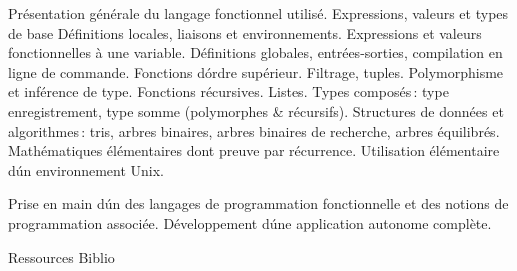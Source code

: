{
Présentation générale du langage fonctionnel utilisé. Expressions, valeurs et types de base Définitions locales, liaisons et environnements.
Expressions et valeurs fonctionnelles à une variable. Définitions globales, entrées-sorties, compilation en ligne de commande.
Fonctions d\'ordre supérieur. Filtrage, tuples. Polymorphisme et inférence de type. Fonctions récursives. Listes. Types composés\,:
type enregistrement, type somme (polymorphes & récursifs). Structures de données et algorithmes\,: tris, arbres binaires, arbres
binaires de recherche, arbres équilibrés.
}
{Mathématiques élémentaires dont preuve par récurrence. Utilisation élémentaire d\'un environnement Unix.}
{\begin{itemize}
 \ObjItem Prise en main d\'un des langages de programmation fonctionnelle et des notions de programmation associée.
 \ObjItem Développement d\'une application autonome complète.
\end{itemize}
}
{Ressources}
{Biblio}
 
\vfill

